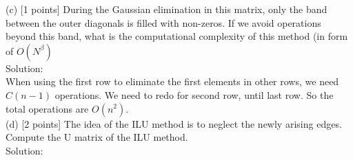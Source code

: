 \documentclass[a4paper]{article}
\begin{document}
\noindent (c) [1 points] During the Gaussian elimination in this matrix, only the band between the outer diagonals is filled with non-zeros. If we avoid operations beyond this band, what is the computational complexity of this method (in form of $O\left(N^{\beta}\right)$\\

\noindent Solution:\\

\noindent When using the first row to eliminate the first elements in other rows, we need $ C \left( n-1 \right) $
operations. We need to redo for second row, until last row. So the total operations are $ O\left( n^2 \right) $.\\

\noindent (d) [2 points] The idea of the ILU method is to neglect the newly arising edges. Compute the U matrix of the ILU method.\\

\noindent Solution:\\
\end{document}
